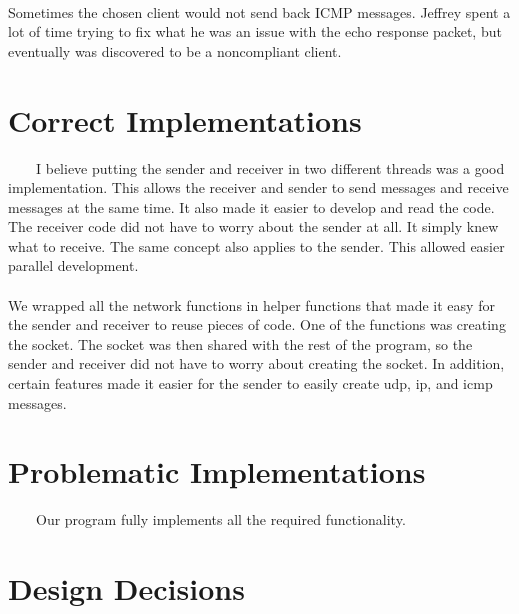 \documentclass[11pt]{article}
\begin{document}
\paragraph{} Sometimes the chosen client would not send back ICMP messages. Jeffrey spent a lot of time trying to fix what he was an issue with the echo response packet, but eventually was discovered to be a noncompliant client.

\section{Correct Implementations}
\ \ \ \ I believe putting the sender and receiver in two different threads was a good implementation. This allows the receiver and sender to send messages and receive messages at the same time. It also made it easier to develop and read the code. The receiver code did not have to worry about the sender at all. It simply knew what to receive. The same concept also applies to the sender. This allowed easier parallel development.
\paragraph{} We wrapped all the network functions in helper functions that made it easy for the sender and receiver to reuse pieces of code. One of the functions was creating the socket. The socket was then shared with the rest of the program, so the sender and receiver did not have to worry about creating the socket. In addition, certain features made it easier for the sender to easily create udp, ip, and icmp messages.

\section{Problematic Implementations}
\ \ \ \ Our program fully implements all the required functionality.

\section{Design Decisions}
\end{document}
